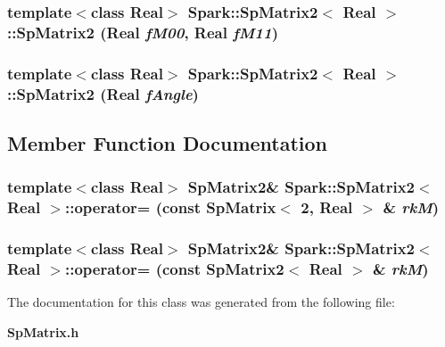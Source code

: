 \subsubsection{\setlength{\rightskip}{0pt plus 5cm}template$<$class Real$>$ {\bf Spark::Sp\-Matrix2}$<$ Real $>$::{\bf Sp\-Matrix2} (Real {\em f\-M00}, Real {\em f\-M11})}\label{classSpark_1_1SpMatrix2_a7}


\subsubsection{\setlength{\rightskip}{0pt plus 5cm}template$<$class Real$>$ {\bf Spark::Sp\-Matrix2}$<$ Real $>$::{\bf Sp\-Matrix2} (Real {\em f\-Angle})}\label{classSpark_1_1SpMatrix2_a8}




\subsection{Member Function Documentation}
\subsubsection{\setlength{\rightskip}{0pt plus 5cm}template$<$class Real$>$ {\bf Sp\-Matrix2}\& {\bf Spark::Sp\-Matrix2}$<$ Real $>$::operator= (const {\bf Sp\-Matrix}$<$ 2, Real $>$ \& {\em rk\-M})}\label{classSpark_1_1SpMatrix2_a10}


\subsubsection{\setlength{\rightskip}{0pt plus 5cm}template$<$class Real$>$ {\bf Sp\-Matrix2}\& {\bf Spark::Sp\-Matrix2}$<$ Real $>$::operator= (const {\bf Sp\-Matrix2}$<$ Real $>$ \& {\em rk\-M})}\label{classSpark_1_1SpMatrix2_a9}




The documentation for this class was generated from the following file:\begin{CompactItemize}
\item 
{\bf Sp\-Matrix.h}\end{CompactItemize}
